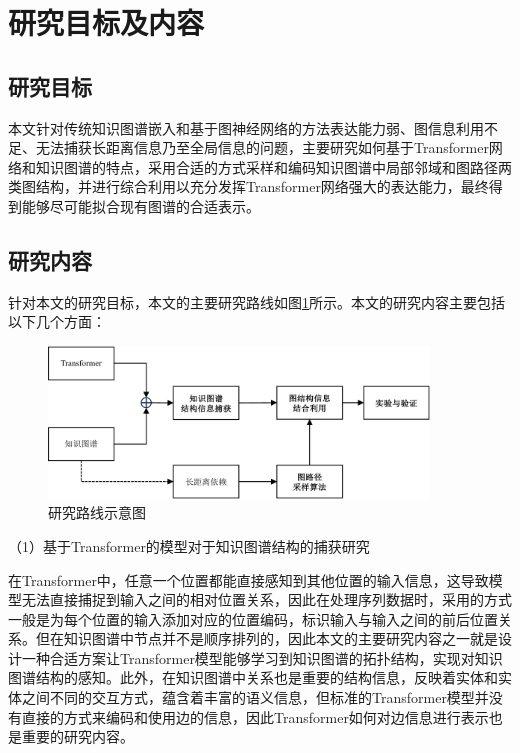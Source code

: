 \section{研究目标及内容}
\subsection{研究目标}
本文针对传统知识图谱嵌入和基于图神经网络的方法表达能力弱、图信息利用不足、无法捕获长距离信息乃至全局信息的问题，主要研究如何基于Transformer网络和知识图谱的特点，采用合适的方式采样和编码知识图谱中局部邻域和图路径两类图结构，并进行综合利用以充分发挥Transformer网络强大的表达能力，最终得到能够尽可能拟合现有图谱的合适表示。

\subsection{研究内容}


针对本文的研究目标，本文的主要研究路线如图\ref{research_route}所示。本文的研究内容主要包括以下几个方面：

\begin{figure}[htb]
  \centerline{\includegraphics[width=0.9\textwidth]{pic/research_route_2.pdf}}
  \caption{研究路线示意图}
  \label{research_route}
\end{figure}

（1）基于Transformer的模型对于知识图谱结构的捕获研究

在Transformer中，任意一个位置都能直接感知到其他位置的输入信息，这导致模型无法直接捕捉到输入之间的相对位置关系，因此在处理序列数据时，采用的方式一般是为每个位置的输入添加对应的位置编码，标识输入与输入之间的前后位置关系。但在知识图谱中节点并不是顺序排列的，因此本文的主要研究内容之一就是设计一种合适方案让Transformer模型能够学习到知识图谱的拓扑结构，实现对知识图谱结构的感知。此外，在知识图谱中关系也是重要的结构信息，反映着实体和实体之间不同的交互方式，蕴含着丰富的语义信息，但标准的Transformer模型并没有直接的方式来编码和使用边的信息，因此Transformer如何对边信息进行表示也是重要的研究内容。

